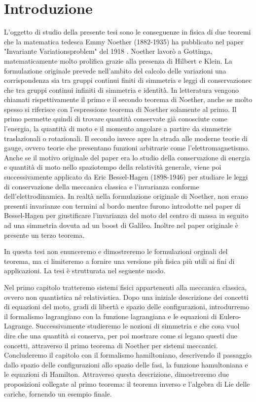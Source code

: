 \chapter*{Introduzione}

    L'oggetto di studio della presente tesi sono le conseguenze in fisica di due teoremi che la matematica tedesca Emmy Noether (1882-1935) ha pubblicato nel paper "Invariante Variationsproblem" del 1918 \cite{noether}. Noether lavorò a Gottinga, matematicamente molto prolifica grazie alla presenza di Hilbert e Klein. La formulazione originale prevede nell'ambito del calcolo delle variazioni una corrispondenza sia tra gruppi continui finiti di simmetria e leggi di conservazionec che tra gruppi continui infiniti di simmetria e identità. In letteratura vengono chiamati rispettivamente il primo e il secondo teorema di Noether, anche se molto spesso si riferisce con l'espressione teorema di Noether solamente al primo. Il primo permette quindi di trovare quantità conservate già conosciute come l'energia, la quantità di moto e il momento angolare a partire da simmetrie traslazionali o rotazionali. Il secondo invece apre la strada alle moderne teorie di gauge, ovvero teorie che presentano funzioni arbitrarie come l'elettromagnetismo. Anche se il motivo originale del paper era lo studio della conservazione di energia e quantità di moto nello spaziotempo della relatività generale, viene poi successivamente applicato da Eric Bessel-Hagen (1898-1946) per studiare le leggi di conservazione della meccanica classica e l'invarianza conforme dell'elettrodinamica. In realtà nella formulazione originale di Noether, non erano presenti invarianze con termini al bordo mentre furono introdotte nel paper di Bessel-Hagen per giustificare l'invarianza del moto del centro di massa in seguito ad una simmetria dovuta ad un boost di Galileo. Inoltre nel paper originale è presente un terzo teorema.

    In questa tesi non enunceremo e dimostreremo le formulazioni orginali del teorema, ma ci limiteremo a fornire una versione più fisica più utili ai fini di applicazioni. La tesi è strutturata nel seguente modo. 
    
    Nel primo capitolo tratteremo sistemi fisici appartenenti alla meccanica classica, ovvero non quantistica né relativistica. Dopo una iniziale descrizione dei concetti di equazioni del moto, gradi di libertà e spazio delle configurazioni, introdurremo il formalismo lagrangiano con la funzione lagrangiana e le equazioni di Eulero-Lagrange. Successivamente studieremo le nozioni di simmetria e che cosa vuol dire che una quantità si conserva, per poi mostrare come si legano questi due concetti, attraverso il primo teorema di Noether per sistemi meccanici. Concluderemo il capitolo con il formalismo hamiltoniano, descrivendo il passaggio dallo spazio delle configurazioni allo spazio delle fasi, la funzione hamultoniana e le equazioni di Hamilton. Attraverso questa descrizione, dimostreremo due proposizioni collegate al primo teorema: il teorema inverso e l'algebra di Lie delle cariche, fornendo un esempio finale.

